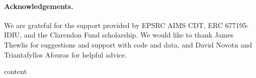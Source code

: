 \documentclass{article}
\begin{document}
\paragraph{Acknowledgements.} We are grateful for the support provided by EPSRC AIMS CDT, ERC 677195-IDIU, and the Clarendon Fund scholarship. We would like to thank James Thewlis for suggestions and support with code and data, and David Novotn and Triantafyllos Afouras for helpful advice.




\clearpage

%


\clearpage
\appendix
{content}\clearpage
\end{document}
